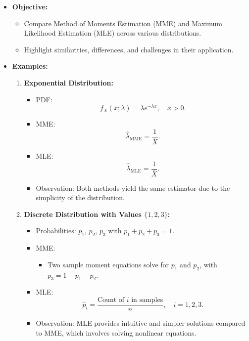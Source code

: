 \documentclass{article}
\begin{document}
\begin{itemize}
  \item \textbf{Objective:}
    \begin{itemize}
      \item Compare Method of Moments Estimation (MME) and Maximum Likelihood Estimation (MLE) across various distributions.
      \item Highlight similarities, differences, and challenges in their application.
    \end{itemize}

  \item \textbf{Examples:}
    \begin{enumerate}
      \item \textbf{Exponential Distribution:}
        \begin{itemize}
          \item PDF:
            \[
              f_X(x; \lambda) = \lambda e^{-\lambda x}, \quad x > 0.
            \]
          \item MME:
            \[
              \hat{\lambda}_{\text{MME}} = \frac{1}{\bar{X}}.
            \]
          \item MLE:
            \[
              \hat{\lambda}_{\text{MLE}} = \frac{1}{\bar{X}}.
            \]
          \item Observation: Both methods yield the same estimator due to the simplicity of the distribution.
        \end{itemize}

      \item \textbf{Discrete Distribution with Values $\{1, 2, 3\}$:}
        \begin{itemize}
          \item Probabilities: $p_1$, $p_2$, $p_3$ with $p_1 + p_2 + p_3 = 1$.
          \item MME:
            \begin{itemize}
              \item Two sample moment equations solve for $p_1$ and $p_2$, with $p_3 = 1 - p_1 - p_2$.
            \end{itemize}
          \item MLE:
            \[
              \hat{p}_i = \frac{\text{Count of } i \text{ in samples}}{n}, \quad i = 1, 2, 3.
            \]
          \item Observation: MLE provides intuitive and simpler solutions compared to MME, which involves solving nonlinear equations.
        \end{itemize}


\end{enumerate}
\end{itemize}
\end{document}
